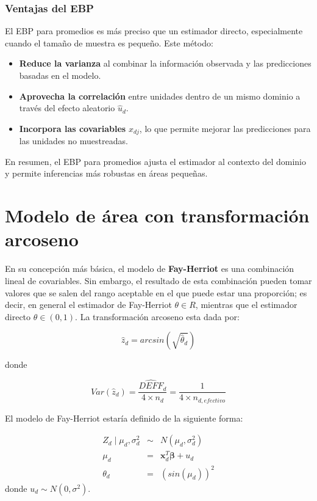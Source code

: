 \documentclass[12pt,spanish]{article}
\begin{document}
\subsubsection*{Ventajas del EBP}

El EBP para promedios es más preciso que un estimador directo, especialmente cuando el tamaño de muestra es pequeño. Este método:

\begin{itemize}
    \item \textbf{Reduce la varianza} al combinar la información observada y las predicciones basadas en el modelo.
    \item \textbf{Aprovecha la correlación} entre unidades dentro de un mismo dominio a través del efecto aleatorio $\hat{u}_d$.
    \item \textbf{Incorpora las covariables} $x_{dj}$, lo que permite mejorar las predicciones para las unidades no muestreadas.
\end{itemize}

En resumen, el EBP para promedios ajusta el estimador al contexto del dominio y permite inferencias más robustas en áreas pequeñas.



\section*{Modelo de área con transformación arcoseno}


En su concepción más básica, el modelo de \textbf{Fay-Herriot} es una combinación lineal de covariables. Sin embargo, el resultado de esta combinación pueden tomar valores que se salen del rango aceptable en el que puede estar una proporción; es decir, en general el estimador de Fay-Herriot $\theta \in R$, mientras que el estimador directo $\theta \in (0,1)$. La transformación arcoseno esta dada por: 

\[
\hat{z}_d = arcsin\left( \sqrt{ \hat{\theta}_d} \right)
\]

donde

\[
Var\left( \hat{z}_d \right) = \frac{\widehat{DEFF}_d}{4\times n_d} = \frac{1}{4\times n_{d,efectivo} }
\]

El modelo de Fay-Herriot  estaría definido de la siguiente forma:


\begin{eqnarray*}
Z_d \mid \mu_d,\sigma^2_d &  \sim  & N(\mu_d, \sigma^2_d)\\
\mu_d & = & \boldsymbol{x}^{T}_{d}\boldsymbol{\beta} + u_d \\
\theta_d & = &  \left(sin(\mu_d)\right)^2
\end{eqnarray*}
donde $u_d \sim N(0 , \sigma^2)$.
\end{document}
